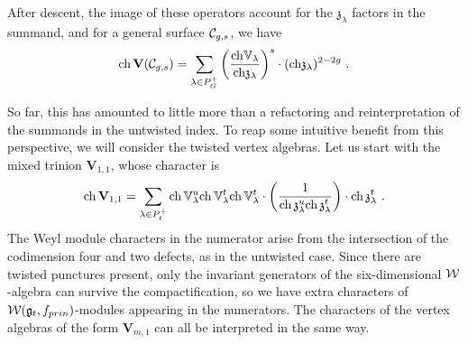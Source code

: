 \documentclass[a4paper]{article}
\def\IV{\mathbb{V}}
\def\CC{{\cal C}}
\def\WW{{\cal W}}
\def\ch{{\rm ch}}
\def\gf{\mathfrak{g}}
\def \zf{\mathfrak{z}}
\def\V{\mathbf{V}}
\begin{document}
After descent, the image of these operators account for the $\zf_\lambda$ factors in the summand, and for a general surface $\CC_{g,s}$, we have
\begin{equation}
	\ch\, \V(\CC_{g,s}) = \sum_{\lambda \in P_G^+} \left(\frac{\ch \IV_\lambda} {\ch \zf_\lambda}\right)^{s} \cdot (\ch \zf_\lambda)^{2-2g}~.
\end{equation}

So far, this has amounted to little more than a refactoring and reinterpretation of the summands in the untwisted index. To reap some intuitive benefit from this perspective, we will consider the twisted vertex algebras. Let us start with the mixed trinion $\V_{1,1}$, whose character is
\begin{equation}
	\ch\, \V_{1,1} = \sum_{\lambda \in P_t^+} \ch\, \IV^u_\lambda \ch\,\IV^t_\lambda \ch\, \IV^t_\lambda \cdot \left( \frac{1}{\ch\, \zf^u_\lambda \ch\, \zf^t_\lambda} \right) \cdot \ch\,\zf^t_\lambda~.
\end{equation}
The Weyl module characters in the numerator arise from the intersection of the codimension four and two defects, as in the untwisted case. Since there are twisted punctures present, only the invariant generators of the six-dimensional $\WW$-algebra can survive the compactification, so we have extra characters of $\WW(\gf_t,f_{prin})$-modules appearing in the numerators. The characters of the vertex algebras of the form $\V_{m,1}$ can all be interpreted in the same way.
\end{document}
